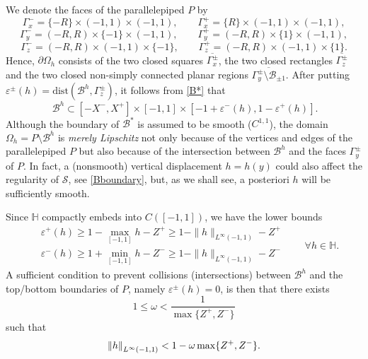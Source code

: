 \documentclass[11pt,a4paper]{amsart}
\def\eps{{\varepsilon}}
\theoremstyle{remark}
\theoremstyle{definition}
\numberwithin{equation}{section}
\numberwithin{proposition}{section}
\begin{document}
	We denote the faces of the parallelepiped $P$ by
	\begin{equation*}
		\Gamma_x^-=\{-R\}\times(-1,1)\times(-1,1), \qquad \Gamma_x^+=\{R\}\times(-1,1)\times(-1,1),
	\end{equation*}
	\begin{equation*}
		\Gamma_y^-=(-R,R)\times\{-1\}\times(-1,1),\qquad 	\Gamma_y^+=(-R,R)\times\{1\}\times(-1,1),
	\end{equation*}
	\begin{equation*}
		\Gamma_z^-=(-R,R)\times(-1,1)\times\{-1\}, \qquad \Gamma_z^+=(-R,R)\times(-1,1)\times\{1\}.
	\end{equation*}
	Hence, $\partial\Omega_h$ consists of the two closed squares $\overline{\Gamma_x^\pm}$, the two closed rectangles $\overline{\Gamma_z^\pm}$
	and the two closed non-simply connected planar regions $\overline{\Gamma_y^\pm\setminus\mathcal{B}_{\pm1}}$.
	After putting $\varepsilon^\pm(h)=\mathrm{dist}(\mathcal{B}^h, \Gamma_z^\pm)$, it follows from \eqref{B*} that
	\begin{equation*}  \ \mathcal{B}^h \subset [-X^-,X^+]\times [-1,1]\times[-1+ \eps^-(h), 1-\eps^+(h)]. \end{equation*}
Although the boundary of $\mathcal{B}^*$ is assumed to be smooth ($C^{1,1}$), the domain $\Omega_h=P\setminus\mathcal{B}^h$ is {\em merely Lipschitz}
	not only because of the vertices and edges of the parallelepiped $P$ but also because of the intersection between $\mathcal{B}^h$ and the faces
	$\Gamma_y^\pm$ of $P$. In fact, a (nonsmooth) vertical displacement $h=h(y)$ could also affect the regularity of $\mathcal{S}$, see \eqref{Bboundary},
	but, as we shall see, a posteriori $h$ will be sufficiently smooth.\par	

	Since $\mathbb{H}$ compactly embeds into $C([-1,1])$,  we have the lower bounds
	\begin{equation}\label{bound-eps+-}\begin{aligned}
			&\varepsilon^+(h)\geq 1-\max_{[-1,1]} h -Z^+ \geq 1- \|h\|_{L^\infty(-1,1)} -Z^+\\
			&\varepsilon^-(h)\geq1+\min_{[-1,1]} h -Z^-\geq 1- \|h\|_{L^\infty(-1,1)} - Z^-
		\end{aligned}\qquad\forall h\in\mathbb{H}.
	\end{equation}
A sufficient condition to prevent collisions (intersections) between $\mathcal{B}^h$ and the top/bottom boundaries of $P$, namely $\eps^\pm (h)=0$, is then that there exists \begin{equation*}
1\leq \omega<\frac{1}{\max\{Z^+,Z^-\}}
\end{equation*} such that
\begin{equation}\label{eq_bound_infty}
\left\|h\right\|_{L^\infty(-1,1)} <	1- \omega\max\{Z^+,Z^- \}.\\[5pt]
\end{equation}
\end{document}
